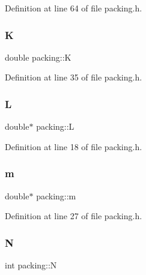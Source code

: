 Definition at line 64 of file packing.\+h.

\mbox{\label{classpacking_acf38ce991d03baddda7344ec7e979f6c}} 
\subsubsection{\texorpdfstring{K}{K}}
{\footnotesize\ttfamily double packing\+::K\hspace{0.3cm}{\ttfamily [protected]}}



Definition at line 35 of file packing.\+h.

\mbox{\label{classpacking_ae4a6707ea8b2af01eda36ea9d230259e}} 
\subsubsection{\texorpdfstring{L}{L}}
{\footnotesize\ttfamily double$\ast$ packing\+::L\hspace{0.3cm}{\ttfamily [protected]}}



Definition at line 18 of file packing.\+h.

\mbox{\label{classpacking_ab06bef3feef42f5c48c39fa1ae297e23}} 
\subsubsection{\texorpdfstring{m}{m}}
{\footnotesize\ttfamily double$\ast$ packing\+::m\hspace{0.3cm}{\ttfamily [protected]}}



Definition at line 27 of file packing.\+h.

\mbox{\label{classpacking_a282fd04f2195ce1535ef9a1eb0c3af40}} 
\subsubsection{\texorpdfstring{N}{N}}
{\footnotesize\ttfamily int packing\+::N\hspace{0.3cm}{\ttfamily [protected]}}



